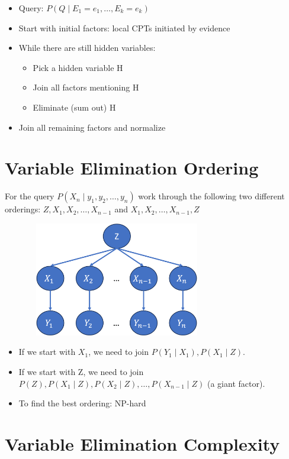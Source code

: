 \documentclass[11pt,a4paper]{report}
\begin{document}
\begin{itemize}
    \item Query: $P(Q \mid E_{1} = e_{1}, \ldots, E_{k} = e_{k})$
    \item Start with initial factors: local CPTs initiated by evidence
    \item While there are still hidden variables:
        \begin{itemize}
            \item Pick a hidden variable H
            \item Join all factors mentioning H
            \item Eliminate (sum out) H
        \end{itemize}
    \item Join all remaining factors and normalize
\end{itemize}

\section{Variable Elimination Ordering}


For the query $P(X_{n} \mid y_{1}, y_{2}, \ldots, y_{n})$ work through the following two different orderings: $Z, X_{1}, X_{2}, \ldots, X_{n-1}$ and $X_{1}, X_{2}, \ldots, X_{n-1}, Z$

\includegraphics[width=10cm, height = 5cm]{ordering.png}

\begin{itemize}
    \item If we start with $X_{1}$, we need to join $P(Y_{1} \mid X_{1}), P(X_{1} \mid Z)$.
    \item If we start with Z, we need to join $P(Z), P(X_{1} \mid Z), P(X_{2} \mid Z), \ldots, P(X_{n-1} \mid Z)$ (a giant factor).
    \item To find the best ordering: NP-hard
\end{itemize}

\section{Variable Elimination Complexity}
\end{document}

